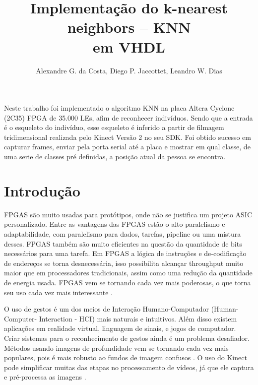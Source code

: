 \documentclass[12pt]{article}
\title{Implementa\c{c}\~ao do k-nearest neighbors -- KNN\\ em VHDL}
\author{Alexandre G. da Costa\inst{1}, Diego P. Jaccottet\inst{1}, Leandro W.
  Dias\inst{1} }
\begin{document}
 

\maketitle

     
\begin{resumo}

Neste trabalho foi implementado o algoritmo KNN na placa Altera Cyclone (2C35)
FPGA de 35.000 LEs, afim de reconhecer indivíduos. Sendo que a entrada é o
esqueleto do indivíduo, esse esqueleto é inferido a partir de filmagem 
tridimensional realizada pelo Kinect Versão 2 no seu SDK. Foi obtido sucesso em
capturar frames, enviar pela porta serial até a placa e mostrar em qual classe,
de uma serie de classes pré definidas, a posição atual da pessoa se encontra.

\end{resumo}

\section{Introdu\c{c}\~ao}

FPGAS são muito usadas para protótipos, onde não se justifica um projeto ASIC
personalizado. Entre as vantagens das FPGAS estão o alto paralelismo e
adaptabilidade, com paralelismo para dados, tarefas, pipeline ou uma mistura
desses. FPGAS também são muito eficientes na questão da quantidade de bits
necessários para uma tarefa. Em FPGAS a lógica de instruções e de-codificação
de endereços se torna desnecessária, isso possibilita alcançar throughput muito
maior que em processadores tradicionais, assim como uma redução da quantidade
de energia usada. FPGAS vem se tornando cada vez mais poderosas, o que torna
seu uso cada vez mais interessante \cite{najjar2003high}.

O uso de gestos é um dos meios de Interação Humano-Computador (Human-Computer-
Interaction - HCI) mais naturais e intuitivos. Além disso existem aplicações em
realidade virtual, linguagem de sinais, e jogos de computador. Criar sistemas
para o reconhecimento de gestos ainda é um problema desafiador. Métodos usando
imagens de profundidade vem se tornando cada vez mais populares, pois é mais
robusto ao fundos de imagem confusos \cite{ren2011robust}. O uso do Kinect pode
simplificar muitas das etapas no processamento de vídeos, já que ele captura e
pré-processa as imagens \cite{Andersson:2014}.
\end{document}
